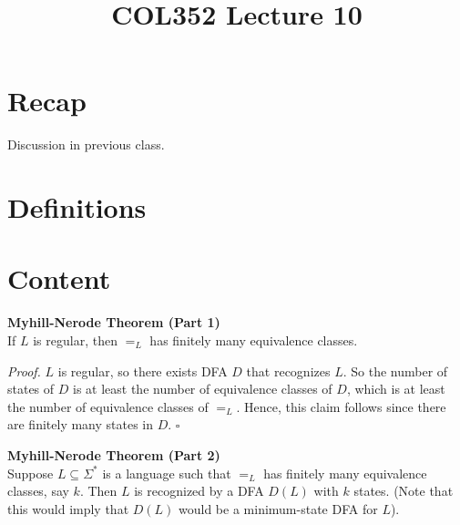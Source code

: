 \documentclass[a4paper]{article}
\title{\textbf{COL352 Lecture 10}}
\date{}
\newenvironment{proof}{\begin{breakbox}\textit{Proof.}}{\hfill$\square$\end{breakbox}}
\newcommand{\nl}{\vspace{0.2cm}\\}
\begin{document}
\maketitle
\tableofcontents

\section{Recap}

Discussion in previous class.

\section{Definitions}

\section{Content}

\begin{theorem}
    \textbf{Myhill-Nerode Theorem (Part 1)}\nl
    If $L$ is regular, then $=_L$ has finitely many equivalence classes.
\end{theorem}

\begin{proof}
    $L$ is regular, so there exists DFA $D$ that recognizes $L$. So the number of states of $D$ is at least the number of equivalence classes of $D$, which is at least the number of
    equivalence classes of $=_L$. Hence, this claim follows since there are finitely many states in $D$.
\end{proof}

\begin{theorem}
    \textbf{Myhill-Nerode Theorem (Part 2)}\nl
    Suppose $L \subseteq \Sigma^*$ is a language such that $=_L$ has finitely many equivalence classes, say $k$. Then $L$ is recognized by a DFA $D(L)$ with $k$ states. 
    (Note that this would imply that $D(L)$ would be a minimum-state DFA for $L$).
\end{theorem}
\end{document}
